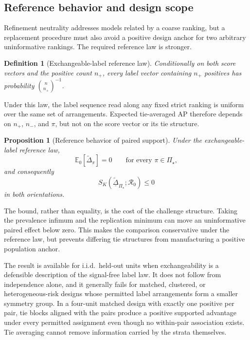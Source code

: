 \documentclass[11pt]{article}
\newcommand{\Regime}{\mathcal{R}}
\newcommand{\PSet}{\Pi_\star}
\newcommand{\E}{\mathbb{E}}
\newcommand{\Dta}{\widetilde{\Delta}}
\newcommand{\RobDta}{\underline{\widetilde{\Delta}}_{\PSet}}
\newtheorem{definition}{Definition}
\newtheorem{proposition}{Proposition}
\theoremstyle{remark}
\begin{document}
\subsection{Reference behavior and design scope}
\label{sec:paired-scope}

Refinement neutrality addresses models related by a coarse ranking, but a replacement procedure must also avoid a positive design anchor for two arbitrary uninformative rankings. The required reference law is stronger.

\begin{definition}[Exchangeable-label reference law]
\label{def:exchangeable}
Conditionally on both score vectors and the positive count $n_+$, every label vector containing $n_+$ positives has probability $\binom{n}{n_+}^{-1}$.
\end{definition}

Under this law, the label sequence read along any fixed strict ranking is uniform over the same set of arrangements. Expected tie-averaged AP therefore depends on $n_+$, $n_-$, and $\pi$, but not on the score vector or its tie structure.

\begin{proposition}[Reference behavior of paired support]
\label{prop:paired-reference}
Under the exchangeable-label reference law,
\[
\E_0[\Dta_\pi]=0
\qquad\text{for every }\pi\in\PSet,
\]
and consequently
\[
S_K(\RobDta;\Regime_0)\leq0
\]
in both orientations.
\end{proposition}

The bound, rather than equality, is the cost of the challenge structure. Taking the prevalence infimum and the replication minimum can move an uninformative paired effect below zero. This makes the comparison conservative under the reference law, but prevents differing tie structures from manufacturing a positive population anchor.

The result is available for i.i.d.\ held-out units when exchangeability is a defensible description of the signal-free label law. It does not follow from independence alone, and it generally fails for matched, clustered, or heterogeneous-risk designs whose permitted label arrangements form a smaller symmetry group. In a four-unit matched design with exactly one positive per pair, tie blocks aligned with the pairs produce a positive supported advantage under every permitted assignment even though no within-pair association exists. Tie averaging cannot remove information carried by the strata themselves.
\end{document}
